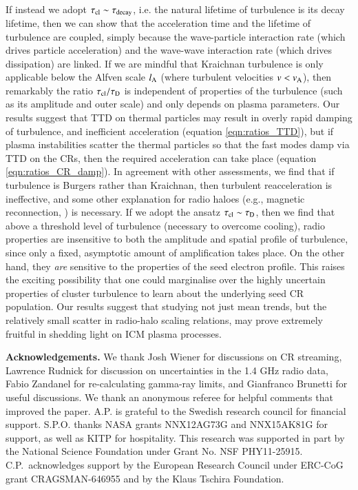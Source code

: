 \documentclass[fleqn,usenatbib,useAMS]{mnras}
\begin{document}
If instead we adopt $\tau_{\rm cl} \sim \tau_{\rm decay}$, i.e. the natural
lifetime of turbulence is its decay lifetime, then we can show that the
acceleration time and the lifetime of turbulence are coupled, simply because the
wave-particle interaction rate (which drives particle acceleration) and the
wave-wave interaction rate (which drives dissipation) are linked. If we are
mindful that Kraichnan turbulence is only applicable below the Alfven scale
$l_{\rm A}$ (where turbulent velocities $v < v_{\rm A}$), then remarkably the
ratio $\tau_{\rm cl}/\tau_{\rm D}$ is independent of properties of the
turbulence (such as its amplitude and outer scale) and only depends on plasma
parameters. Our results suggest that TTD on thermal particles may result in
overly rapid damping of turbulence, and inefficient acceleration (equation
\ref{eqn:ratios_TTD}), but if plasma instabilities scatter the thermal particles
so that the fast modes damp via TTD on the CRs, then the required
acceleration can take place (equation \ref{eqn:ratios_CR_damp}). In agreement
with other assessments, we find that if turbulence is Burgers rather than
Kraichnan, then turbulent reacceleration is ineffective, and some other
explanation for radio haloes (e.g., magnetic reconnection, \citealt{brunetti16}) is
necessary. If we adopt the ansatz $\tau_{\rm cl} \sim \tau_{\rm D}$, then we
find that above a threshold level of turbulence (necessary to overcome cooling),
radio properties are insensitive to both the amplitude and spatial profile of
turbulence, since only a fixed, asymptotic amount of amplification takes
place. On the other hand, they {\it are} sensitive to the properties of the seed
electron profile. This raises the exciting possibility that one could
marginalise over the highly uncertain properties of cluster turbulence to learn
about the underlying seed CR population. Our results suggest that studying not
just mean trends, but the relatively small scatter in radio-halo scaling
relations, may prove extremely fruitful in shedding light on ICM plasma
processes.


{\bf Acknowledgements.} We thank Josh Wiener for discussions on CR streaming,
Lawrence Rudnick for discussion on uncertainties in the 1.4 GHz radio data,
Fabio Zandanel for re-calculating gamma-ray limits, and Gianfranco Brunetti for
useful discussions. We thank an anonymous referee for helpful comments that
improved the paper. A.P. is grateful to the Swedish research council for
financial support. S.P.O. thanks NASA grants NNX12AG73G and NNX15AK81G for
support, as well as KITP for hospitality. This research was supported in part by
the National Science Foundation under Grant No. NSF
PHY11-25915. C.P.~acknowledges support by the European Research Council under
ERC-CoG grant CRAGSMAN-646955 and by the Klaus Tschira Foundation.


\vspace{-0.7cm}



\end{document}

